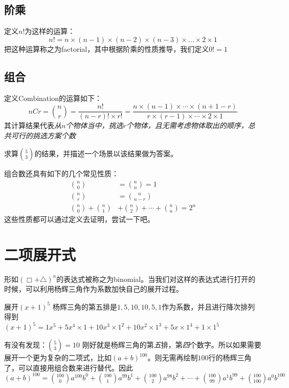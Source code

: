 \subsection*{阶乘}
\label{subsec:Factorial}
定义$n!$为这样的运算：
\[
	n!=n\times (n-1)\times(n-2)\times(n-3)\times \ldots \times 2\times 1 
\]
把这种运算称之为\gls{factorial}，其中根据阶乘的性质推导，我们定义$0!=1$


\subsection*{组合}
定义Combination的运算如下：
\[
	nCr={n\choose r}=\frac{n!}{(n-r)!\times r!}=\frac{n\times(n-1)\times \cdots \times(n+1-r)}{r\times (r-1)\times \cdots \times 2\times 1}
\]
其计算结果代表\emph{从$n$个物体当中，挑选$r$个物体，且无需考虑物体取出的顺序，总共可行的挑选方案个数}

\begin{TaskBox}
求算${5\choose 3}$的结果，并描述一个场景以该结果做为答案。
\end{TaskBox}

组合数还具有如下的几个常见性质：
\begin{align*}
{n\choose 0} &= {n\choose n}=1\\
{n\choose r} &= {n\choose n-r}\\
{n\choose 0}+{n\choose 1} &+{n\choose 2}+\cdots +{n\choose n}=2^n
\end{align*}
这些性质都可以通过定义去证明，尝试一下吧。
\clearpage


\section{二项展开式}
\label{sec:Binomial Expansion}
形如$(\Box+\triangle)^n$的表达式被称之为\gls{binomial}。当我们对这样的表达式进行打开的时候，可以利用杨辉三角作为系数加快自己的展开过程。

\begin{ExampleBox}
展开$(x+1)^5$
\tcblower
杨辉三角的第五排是$1,5,10,10,5,1$作为系数，并且进行降次排列得到\\
$(x+1)^5=1x^5+5x^4\times1+10x^3\times 1^2+10x^2\times 1^3+5x\times1^4+1\times 1^5$
\end{ExampleBox}

有没有发现：${5\choose 3}=10$ 刚好就是杨辉三角的第\emph{五}排，第\emph{四}个数字。所以如果需要展开一个更为复杂的二项式，比如$(a+b)^{100}$。则无需再绘制$100$行的杨辉三角了，可以直接用组合数来进行替代。因此$(a+b)^{100}={100\choose 0}a^{100}b^0+{100\choose 1}a^{99}b^1+{100\choose 2}a^{98}b^2+\cdots + {100\choose 99}a^1b^{99}+ {100\choose 100}a^0 b^{100}$

